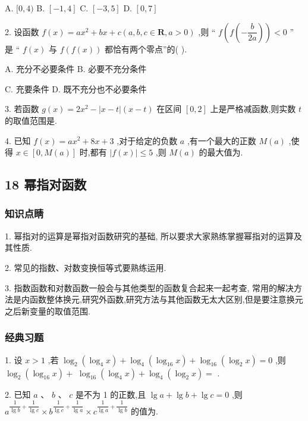 A. $\lbrack 0,4)$ B. $\left\lbrack  {-1,4}\right\rbrack$ C. $\left\lbrack  {-3,5}\right\rbrack$ D. $\left\lbrack  {0,7}\right\rbrack$

2. 设函数 $f\left( x\right)  = a{x}^{2} + {bx} + c\left( {a,b,c \in  \mathbf{R},a > 0}\right)$ ,则 “ $f\left( {f\left( {-\dfrac{b}{2a}}\right) }\right)  < 0$ ” 是 “ $f\left( x\right)$ 与 $f\left( {f\left( x\right) }\right)$ 都恰有两个零点”的(   ).

A. 充分不必要条件 B. 必要不充分条件

C. 充要条件 D. 既不充分也不必要条件

3. 若函数 $g\left( x\right)  = 2{x}^{2} - \left| {x - t}\right| \left( {x - t}\right)$ 在区间 $\left\lbrack  {0,2}\right\rbrack$ 上是严格减函数,则实数 $t$ 的取值范围是\blkda{}.

4. 已知 $f\left( x\right)  = a{x}^{2} + {8x} + 3$ ,对于给定的负数 $a$ ,有一个最大的正数 $M\left( a\right)$ ,使得 $x \in  \left\lbrack  {0,M\left( a\right) }\right\rbrack$ 时,都有 $\left| {f\left( x\right) }\right|  \leq  5$ ,则 $M\left( a\right)$ 的最大值为\blkda{}.

\subsection*{18 幂指对函数}

\subsubsection*{知识点睛}

1. 幂指对的运算是幂指对函数研究的基础, 所以要求大家熟练掌握幂指对的运算及其性质.

2. 常见的指数、对数变换恒等式要熟练运用.

3. 指数函数和对数函数一般会与其他类型的函数复合起来一起考查, 常用的解决方法是内函数整体换元,研究外函数,研究方法与其他函数无太大区别,但是要注意换元之后新变量的取值范围.

\subsubsection*{经典习题}

1. 设 $x > 1$ ,若 ${\log }_{2}\left( {{\log }_{4}x}\right)  + {\log }_{4}\left( {{\log }_{16}x}\right)  + {\log }_{16}\left( {{\log }_{2}x}\right)  = 0$ ,则 ${\log }_{2}\left( {{\log }_{16}x}\right)  +$  ${\log }_{16}\left( {{\log }_{4}x}\right)  + {\log }_{4}\left( {{\log }_{2}x}\right)  =$ \blkda{}.

2. 已知 $a$ 、 $b$ 、 $c$ 是不为 1 的正数,且 $\lg a + \lg b + \lg c = 0$ ,则 ${a}^{\dfrac{1}{\lg b} + \dfrac{1}{\lg c}} \times  {b}^{\dfrac{1}{\lg c} + \dfrac{1}{\lg a}} \times  {c}^{\dfrac{1}{\lg a} + \dfrac{1}{\lg b}}$ 的值为\blkda{}.

